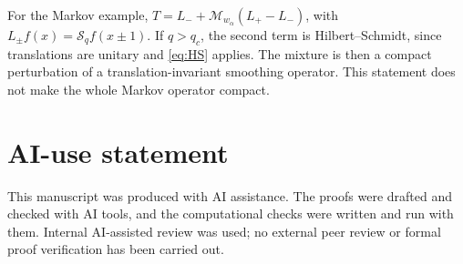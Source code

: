 \documentclass[11pt,a4paper]{article}
\theoremstyle{remark}
\newcommand{\Mult}{\mathcal M}
\begin{document}
For the Markov example, $T=L_-+
\Mult_{w_\alpha}(L_+-L_-)$, with $L_\pm f(x)=\mathcal S_qf(x\pm1)$.
If $q>q_c$, the second term is Hilbert--Schmidt, since
translations are unitary and \eqref{eq:HS} applies.
The mixture is then a compact perturbation of a
translation-invariant smoothing operator. This statement
does not make the whole Markov operator compact.

\section*{AI-use statement}
This manuscript was produced with AI assistance. The proofs were drafted
and checked with AI tools, and the computational checks were written and
run with them. Internal AI-assisted review was used; no external peer
review or formal proof verification has been carried out.
\end{document}
